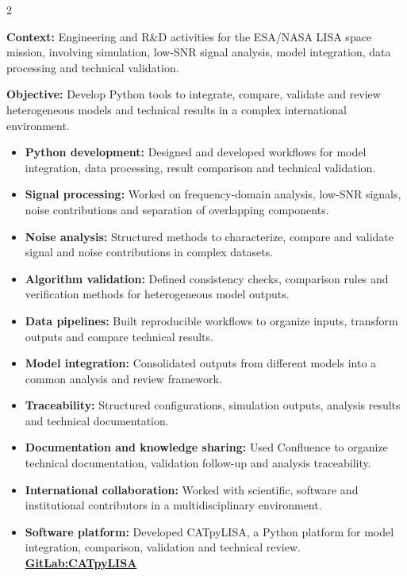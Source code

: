 \documentclass[8pt,a4paper,ragged2e,withhyper]{altacv}
\begin{document}
\begin{paracol}{2}
\divider


\textbf{Context:} Engineering and R\&D activities for the ESA/NASA LISA space mission, involving simulation, low-SNR signal analysis, model integration, data processing and technical validation.

\textbf{Objective:} Develop Python tools to integrate, compare, validate and review heterogeneous models and technical results in a complex international environment.

\begin{itemize}
  \item \textbf{Python development:} Designed and developed workflows for model integration, data processing, result comparison and technical validation.
  \item \textbf{Signal processing:} Worked on frequency-domain analysis, low-SNR signals, noise contributions and separation of overlapping components.
  \item \textbf{Noise analysis:} Structured methods to characterize, compare and validate signal and noise contributions in complex datasets.
  \item \textbf{Algorithm validation:} Defined consistency checks, comparison rules and verification methods for heterogeneous model outputs.
  \item \textbf{Data pipelines:} Built reproducible workflows to organize inputs, transform outputs and compare technical results.
  \item \textbf{Model integration:} Consolidated outputs from different models into a common analysis and review framework.
  \item \textbf{Traceability:} Structured configurations, simulation outputs, analysis results and technical documentation.
  \item \textbf{Documentation and knowledge sharing:} Used Confluence to organize technical documentation, validation follow-up and analysis traceability.
  \item \textbf{International collaboration:} Worked with scientific, software and institutional contributors in a multidisciplinary environment.
  \item \textbf{Software platform:} Developed CATpyLISA, a Python platform for model integration, comparison, validation and technical review.
  \textcolor{DarkPastelRed}{\href{https://gitlab.oca.eu/gboileau/lisa_l3_tools}{\bf GitLab:CATpyLISA}}
\end{itemize}


\end{paracol}
\end{document}
